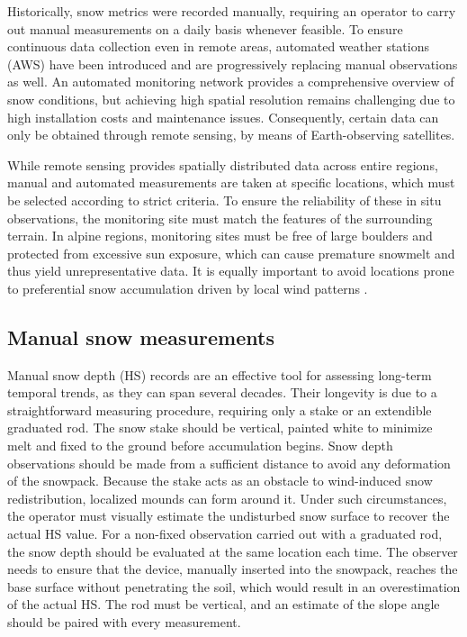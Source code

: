 Historically, snow metrics were recorded manually, requiring an operator to carry out manual measurements on a daily basis whenever feasible. 
To ensure continuous data collection even in remote areas, automated weather stations (AWS) have been introduced and are progressively 
replacing manual observations as well. An automated monitoring network provides a comprehensive overview of snow conditions, but achieving high spatial 
resolution remains challenging due to high installation costs and maintenance issues. Consequently, certain data can only be obtained through remote 
sensing, by means of Earth-observing satellites.

While remote sensing provides spatially distributed data across entire regions, manual and automated measurements are taken at specific locations, 
which must be selected according to strict criteria. To ensure the reliability of these in situ observations, the monitoring site must match the 
features of the surrounding terrain. In alpine regions, monitoring sites must be free of large boulders and protected from excessive sun 
exposure, which can cause premature snowmelt and thus yield unrepresentative data. It is equally important to avoid locations prone to preferential 
snow accumulation driven by local wind patterns \parencite{snow_instrument}.



\subsection{Manual snow measurements}

Manual snow depth (HS) records are an effective tool for assessing long-term temporal trends, as they can span several decades. Their longevity is 
due to a straightforward measuring procedure, requiring only a stake or an extendible graduated rod. The snow stake should be vertical, painted 
white to minimize melt and fixed to the ground before accumulation begins. Snow depth observations should be made from a sufficient distance to 
avoid any deformation of the snowpack. Because the stake acts as an obstacle to wind-induced snow redistribution, localized mounds can form around it. 
Under such circumstances, the operator must visually estimate the undisturbed snow surface to recover the actual HS value. For a non-fixed observation 
carried out with a graduated rod, the snow depth should be evaluated at the same location each time. The observer needs to ensure that the device, 
manually inserted into the snowpack, reaches the base surface without penetrating the soil, which would result in an overestimation of the actual HS. 
The rod must be vertical, and an estimate of the slope angle should be paired with every measurement.

